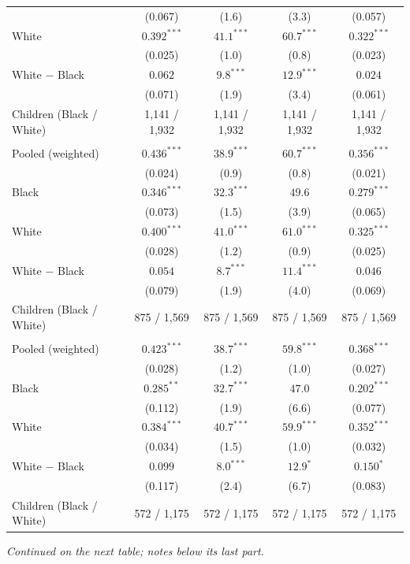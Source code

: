 \begin{table}[!htbp]
{{\begin{tabular}{lcccc}
 & (0.067) & (1.6) & (3.3) & (0.057) \\
White & $0.392^{***}$ & $41.1^{***}$ & $60.7^{***}$ & $0.322^{***}$ \\
 & (0.025) & (1.0) & (0.8) & (0.023) \\
White $-$ Black & $0.062$ & $9.8^{***}$ & $12.9^{***}$ & $0.024$ \\
 & (0.071) & (1.9) & (3.4) & (0.061) \\
Children (Black / White) & 1,141 / 1,932 & 1,141 / 1,932 & 1,141 / 1,932 & 1,141 / 1,932 \\
\addlinespace
\multicolumn{5}{l}{\textit{Age 35--39}} \\
Pooled (weighted) & $0.436^{***}$ & $38.9^{***}$ & $60.7^{***}$ & $0.356^{***}$ \\
 & (0.024) & (0.9) & (0.8) & (0.021) \\
Black & $0.346^{***}$ & $32.3^{***}$ & $49.6$ & $0.279^{***}$ \\
 & (0.073) & (1.5) & (3.9) & (0.065) \\
White & $0.400^{***}$ & $41.0^{***}$ & $61.0^{***}$ & $0.325^{***}$ \\
 & (0.028) & (1.2) & (0.9) & (0.025) \\
White $-$ Black & $0.054$ & $8.7^{***}$ & $11.4^{***}$ & $0.046$ \\
 & (0.079) & (1.9) & (4.0) & (0.069) \\
Children (Black / White) & 875 / 1,569 & 875 / 1,569 & 875 / 1,569 & 875 / 1,569 \\
\addlinespace
\multicolumn{5}{l}{\textit{Age 40--44}} \\
Pooled (weighted) & $0.423^{***}$ & $38.7^{***}$ & $59.8^{***}$ & $0.368^{***}$ \\
 & (0.028) & (1.2) & (1.0) & (0.027) \\
Black & $0.285^{**}$ & $32.7^{***}$ & $47.0$ & $0.202^{***}$ \\
 & (0.112) & (1.9) & (6.6) & (0.077) \\
White & $0.384^{***}$ & $40.7^{***}$ & $59.9^{***}$ & $0.352^{***}$ \\
 & (0.034) & (1.5) & (1.0) & (0.032) \\
White $-$ Black & $0.099$ & $8.0^{***}$ & $12.9^{*}$ & $0.150^{*}$ \\
 & (0.117) & (2.4) & (6.7) & (0.083) \\
Children (Black / White) & 572 / 1,175 & 572 / 1,175 & 572 / 1,175 & 572 / 1,175 \\
\bottomrule
\end{tabular}}}
\par\smallskip
\begin{minipage}{\textwidth}\footnotesize \textit{Continued on the next table; notes below its last part.}\end{minipage}
\end{table}

